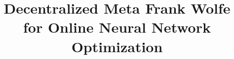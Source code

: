 \documentclass[conference]{IEEEtran}
\begin{document}
\title{Decentralized Meta Frank Wolfe for Online Neural Network Optimization}



\maketitle
\end{document}
